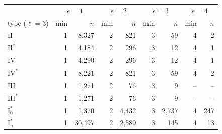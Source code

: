 \begin{tabular}{l rr rr rr rr}
\toprule
 & \multicolumn{2}{c}{$e=1$} & \multicolumn{2}{c}{$e=2$} & \multicolumn{2}{c}{$e=3$} & \multicolumn{2}{c}{$e=4$}\\
type ($\ell=3$) & min & $n$ & min & $n$ & min & $n$ & min & $n$\\
\midrule
$\mathrm{II}$ & 1 & 8,327 & 2 & 821 & 3 & 59 & 4 & 2\\
$\mathrm{II}^*$ & 1 & 4,184 & 2 & 296 & 3 & 12 & 4 & 1\\
$\mathrm{IV}$ & 1 & 4,290 & 2 & 296 & 3 & 12 & 4 & 1\\
$\mathrm{IV}^*$ & 1 & 8,221 & 2 & 821 & 3 & 59 & 4 & 2\\
$\mathrm{III}$ & 1 & 1,271 & 2 & 76 & 3 & 9 & -- & --\\
$\mathrm{III}^*$ & 1 & 1,271 & 2 & 76 & 3 & 9 & -- & --\\
$\mathrm{I}_0^*$ & 1 & 1,370 & 2 & 4,432 & 3 & 2,737 & 4 & 247\\
$\mathrm{I}_n^*$ & 1 & 30,497 & 2 & 2,589 & 3 & 145 & 4 & 13\\
\bottomrule
\end{tabular}
